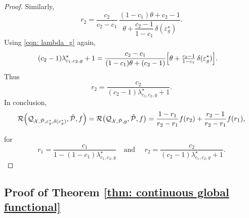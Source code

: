 \documentclass[accepted]{article}
\theoremstyle{plain} %
\theoremstyle{definition}
\theoremstyle{remark}
\begin{document}
\begin{proof}
Similarly,
\[
r_2
  = \frac{c_2}{c_2-c_1}\,
    \frac{(1-c_1)\theta + c_2 - 1}
         {\theta + \dfrac{c_2-1}{1-c_1}\,\delta(\varepsilon_g^\star)} .
\]
Using \eqref{eqn: lambda_g} again,
\begin{align*}
(c_2-1)\lambda_{c_1,c_2,g}^\star + 1
  &= \frac{c_2-c_1}{(1-c_1)\theta + (c_2-1)}
     \Bigl[\theta + \tfrac{c_2-1}{1-c_1}\,\delta(\varepsilon_g^\star)\Bigr].
\end{align*}
Thus
\[
r_2
 = \frac{c_2}{(c_2-1)\lambda_{c_1,c_2,g}^\star + 1 }.
\]
In conclusion,
\[\mathcal{R}\Bigl(\mathcal{Q}_{\mathcal{X}, \tilde{\mathcal{P}}, \varepsilon^\star_g, \delta(\varepsilon^\star_g)}, 
                    \tilde{\mathcal{P}}, f\Bigr) = \mathcal{R}\big(\mathcal{Q}_{\mathcal{X}, \tilde{\mathcal{P}}, g}, \tilde{\mathcal{P}}, f\big) = \frac{1 - r_1}{r_2 - r_1} f(r_2) + \frac{r_2 - 1}{r_2 - r_1} f(r_1),
\]

for\[r_1=\frac{c_1}{1-(1-c_1)\lambda_{c_1,c_2,g}^\star} \quad \text{and } \quad r_2=\frac{c_2}{(c_2-1)\lambda_{c_1,c_2,g}^\star+1}.\]
\end{proof}

\subsection{Proof of Theorem \ref{thm: continuous global functional}}
\end{document}
